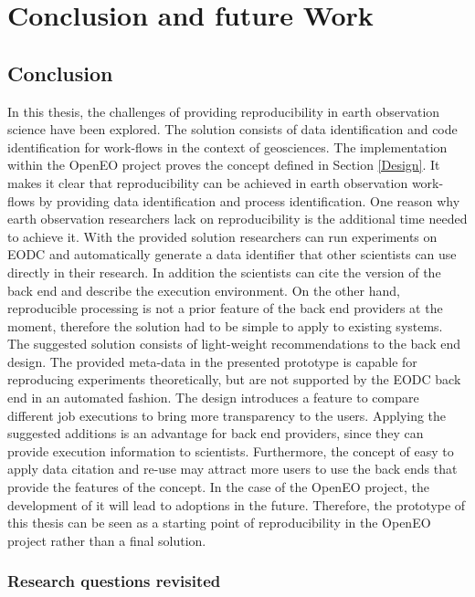 \documentclass[draft,final]{vutinfth} %
\begin{document}

\chapter{Conclusion and future Work}\label{Conclusion}

\section{Conclusion}

In this thesis, the challenges of providing reproducibility in earth observation science have been explored. The solution consists of data identification and code identification for work-flows in the context of geosciences. The implementation within the OpenEO project proves the concept defined in Section \ref{Design}. It makes it clear that reproducibility can be achieved in earth observation work-flows by providing data identification and process identification. One reason why earth observation researchers lack on reproducibility is the additional time needed to achieve it. With the provided solution researchers can run experiments on EODC and automatically generate a data identifier that other scientists can use directly in their research. In addition the scientists can cite the version of the back end and describe the execution environment. On the other hand, reproducible processing is not a prior feature of the back end providers at the moment, therefore the solution had to be simple to apply to existing systems. The suggested solution consists of light-weight recommendations to the back end design. The provided meta-data in the presented prototype is capable for reproducing experiments theoretically, but are not supported by the EODC back end in an automated fashion. The design introduces a feature to compare different job executions to bring more transparency to the users. Applying the suggested additions is an advantage for back end providers, since they can provide execution information to scientists. Furthermore, the concept of easy to apply data citation and re-use may attract more users to use the back ends that provide the features of the concept. In the case of the OpenEO project, the development of it will lead to adoptions in the future. Therefore, the prototype of this thesis can be seen as a starting point of reproducibility in the OpenEO project rather than a final solution.  

\subsection{Research questions revisited}\label{research question revisited}
\end{document}
